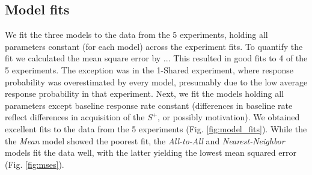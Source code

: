 \subsection*{Model fits}
We fit the three models to the data from the 5 experiments, holding all parameters constant (for each model) across the experiment fits.  
To quantify the fit we calculated the mean square error by ...
This resulted in good fits to 4 of the 5 experiments. 
The exception was in the 1-Shared experiment, where response probability was overestimated by every model, presumably due to the low average response probability in that experiment.  
Next, we fit the models holding all parameters except baseline response rate constant (differences in baseline rate reflect differences in acquisition of the $S^+$, or possibly motivation). 
We obtained excellent fits to the data from the 5 experiments (Fig. \ref{fig:model_fits}).  
While the the \textit{Mean} model showed the poorest fit, the \textit{All-to-All} and \textit{Nearest-Neighbor} models fit the data well, with the latter yielding the lowest mean squared error (Fig. \ref{fig:mses}).  